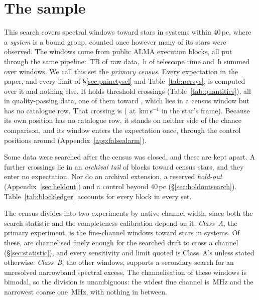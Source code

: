 \section{The sample}
\label{sec:sample}

This search covers \NWindows{} spectral windows toward \NStars{} stars in
\NSystems{} systems within 40\,pc, where a \emph{system} is a bound group,
counted once however many of its stars were observed. The windows come from
\NEB{} public ALMA execution blocks, all put through the same pipeline:
\TotalDataTB\,TB of raw data, \StTelHours\,h of telescope time and
\LdgCensusHours\,h summed over windows. We call this set the \emph{primary
census}. Every expectation in the paper, and every limit of
\S\ref{sec:pninetysel} and Table~\ref{tab:persys}, is computed over it and
nothing else. It holds \CsNCross{} threshold crossings
(Table~\ref{tab:quantities}), all in quality-passing data, one of them toward
\CtUncatStar, which lies in a census window but has no catalogue row.
That crossing is \MbUncatAttrWord{} (\MbUncatTrans{} at \MbUncatDv\,km\,s$^{-1}$
in the star's frame). Because its own position has no catalogue row, it
stands on neither side of the chance comparison, and its window enters the
expectation once, through the control positions around \MbUncatHost{}
(Appendix~\ref{app:falsealarm}).

Some data were searched after the census was closed, and these are kept
apart. A further \CeNTailCross{} crossings lie in an \emph{archival tail} of
\LdgExtTail{} blocks toward \LdgTailStars{} census stars, and they enter no
expectation. Nor do an archival extension, a reserved \emph{hold-out}
(Appendix~\ref{sec:heldout}) and a control beyond 40\,pc
(\S\ref{sec:holdoutsearch}). Table~\ref{tab:blockledger} accounts for every
block in every set.

The census divides into two experiments by native channel width, since both
the search statistic and the completeness calibration depend on it.
\emph{Class~A}, the primary experiment, is the \NWinA{} fine-channel windows
toward \LdgClassAStars{} stars in \NSysClassA{} systems. Of these,
\EtaDriftAOk{} are channelised finely enough for the searched drift to cross a
channel (\S\ref{sec:statistic}), and every sensitivity and limit quoted is
Class~A's unless stated otherwise. \emph{Class~B}, the other \NWinB{}
windows, supports a secondary search for an unresolved narrowband spectral
excess. The channelisation of these windows is bimodal, so the division is
unambiguous: the widest fine channel is \ScChanFineMaxMHz\,MHz and the
narrowest coarse one \ScChanCoarseMinMHz\,MHz, with nothing in between.

